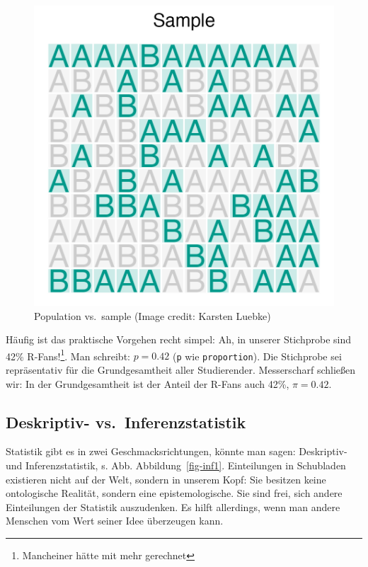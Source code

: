\documentclass[
  a4paper,
  DIV=11]{scrreprt}
\theoremstyle{definition}
\theoremstyle{remark}
\begin{document}
\begin{figure}
\begin{minipage}[t]{0.50\linewidth}
{{\includegraphics{./img/psti.png}

}

}

\end{minipage}%

\caption{\label{fig-pop-sample}Population vs.~sample (Image credit:
Karsten Luebke)}

\end{figure}

Häufig ist das praktische Vorgehen recht simpel: Ah, in unserer
Stichprobe sind 42\% R-Fans!\footnote{Mancheiner hätte mit mehr
  gerechnet}. Man schreibt: \(p = 0.42\) (\texttt{p} wie
\texttt{proportion}). Die Stichprobe sei repräsentativ für die
Grundgesamtheit aller Studierender. Messerscharf schließen wir: In der
Grundgesamtheit ist der Anteil der R-Fans auch 42\%, \(\pi=0.42\).

\hypertarget{deskriptiv--vs.-inferenzstatistik}{%
\subsection{Deskriptiv-
vs.~Inferenzstatistik}\label{deskriptiv--vs.-inferenzstatistik}}

Statistik gibt es in zwei Geschmacksrichtungen, könnte man sagen:
Deskriptiv- und Inferenzstatistik, s. Abb. Abbildung~\ref{fig-inf1}.
Einteilungen in Schubladen existieren nicht auf der Welt, sondern in
unserem Kopf: Sie besitzen keine ontologische Realität, sondern eine
epistemologische. Sie sind frei, sich andere Einteilungen der Statistik
auszudenken. Es hilft allerdings, wenn man andere Menschen vom Wert
seiner Idee überzeugen kann.
\end{document}
